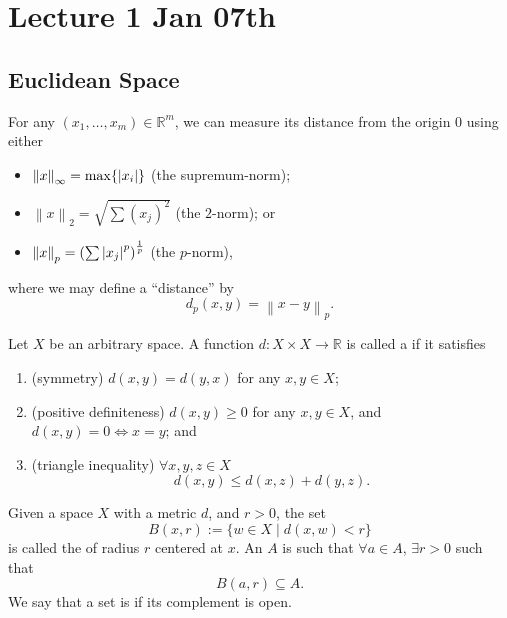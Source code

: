 \documentclass[notoc,notitlepage]{tufte-book}
\newcommand{\norm}[1]{\left\| #1 \right\|}
\begin{document}
\chapter{Lecture 1 Jan 07th}%
\label{chp:lecture_1_jan_07th}

\section{Euclidean Space}%
\label{sec:euclidean_space}

For any $(x_1, \ldots, x_m) \in \mathbb{R}^m$, we can measure its distance from the origin $0$ using either
\begin{itemize}
  \item $\norm{x}_\infty = \max \{ \abs{ x_i } \}$ (the supremum-norm);
  \item $\norm{x}_2 = \sqrt{ \sum (x_j)^2 }$ (the $2$-norm); or
  \item $\norm{x}_p = \left( \sum \abs{ x_j }^p \right)^\frac{1}{p}$ (the $p$-norm),
\end{itemize}
where we may define a ``distance'' by
\begin{equation*}
  d_p(x, y) = \norm{ x - y }_p.
\end{equation*}

\begin{defn}[Metric]\label{defn:metric}
  Let $X$ be an arbitrary space. A function $d : X \times X \to \mathbb{R}$ is called a  if it satisfies
  \begin{enumerate}
    \item (symmetry) $d(x, y) = d(y, x)$ for any $x, y \in X$;
    \item (positive definiteness) $d(x, y) \geq 0$ for any $x, y \in X$, and $d(x, y) = 0 \iff x = y$; and
    \item (triangle inequality) $\forall x, y, z \in X$
      \begin{equation*}
        d(x, y) \leq d(x, z) + d(y, z).
      \end{equation*}
  \end{enumerate}
\end{defn}

\begin{defn}\label{defn:open_and_closed_sets}
  Given a space $X$ with a metric $d$, and $r > 0$, the set
  \begin{equation*}
    B(x, r) := \{ w \in X \mid d(x, w) < r \}
  \end{equation*}
  is called the  of radius $r$ centered at $x$. An  $A$ is such that $\forall a \in A$, $\exists r > 0$ such that
  \begin{equation*}
    B(a, r) \subseteq A.
  \end{equation*}
  We say that a set is  if its complement is open.
\end{defn}
\end{document}
